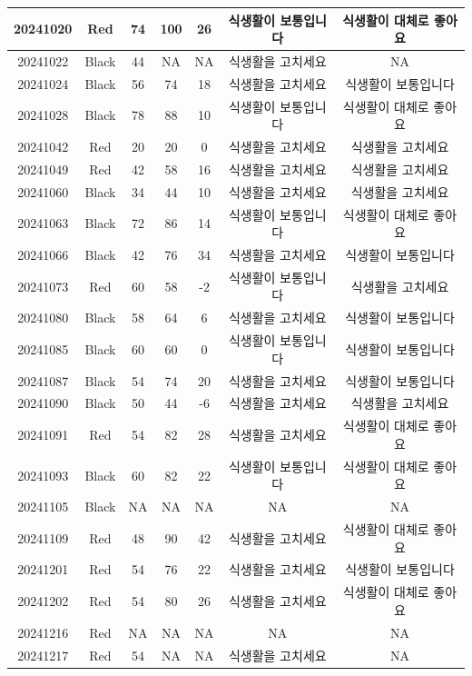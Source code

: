 \documentclass[
]{book}
\begin{document}
\begin{tabular}{c|c|c|c|c|c|c}
\hline
20241020 & Red & 74 & 100 & 26 & 식생활이 보통입니다 & 식생활이 대체로 좋아요\\
\hline
20241022 & Black & 44 & NA & NA & 식생활을 고치세요 & NA\\
\hline
20241024 & Black & 56 & 74 & 18 & 식생활을 고치세요 & 식생활이 보통입니다\\
\hline
20241028 & Black & 78 & 88 & 10 & 식생활이 보통입니다 & 식생활이 대체로 좋아요\\
\hline
20241042 & Red & 20 & 20 & 0 & 식생활을 고치세요 & 식생활을 고치세요\\
\hline
20241049 & Red & 42 & 58 & 16 & 식생활을 고치세요 & 식생활을 고치세요\\
\hline
20241060 & Black & 34 & 44 & 10 & 식생활을 고치세요 & 식생활을 고치세요\\
\hline
20241063 & Black & 72 & 86 & 14 & 식생활이 보통입니다 & 식생활이 대체로 좋아요\\
\hline
20241066 & Black & 42 & 76 & 34 & 식생활을 고치세요 & 식생활이 보통입니다\\
\hline
20241073 & Red & 60 & 58 & -2 & 식생활이 보통입니다 & 식생활을 고치세요\\
\hline
20241080 & Black & 58 & 64 & 6 & 식생활을 고치세요 & 식생활이 보통입니다\\
\hline
20241085 & Black & 60 & 60 & 0 & 식생활이 보통입니다 & 식생활이 보통입니다\\
\hline
20241087 & Black & 54 & 74 & 20 & 식생활을 고치세요 & 식생활이 보통입니다\\
\hline
20241090 & Black & 50 & 44 & -6 & 식생활을 고치세요 & 식생활을 고치세요\\
\hline
20241091 & Red & 54 & 82 & 28 & 식생활을 고치세요 & 식생활이 대체로 좋아요\\
\hline
20241093 & Black & 60 & 82 & 22 & 식생활이 보통입니다 & 식생활이 대체로 좋아요\\
\hline
20241105 & Black & NA & NA & NA & NA & NA\\
\hline
20241109 & Red & 48 & 90 & 42 & 식생활을 고치세요 & 식생활이 대체로 좋아요\\
\hline
20241201 & Red & 54 & 76 & 22 & 식생활을 고치세요 & 식생활이 보통입니다\\
\hline
20241202 & Red & 54 & 80 & 26 & 식생활을 고치세요 & 식생활이 대체로 좋아요\\
\hline
20241216 & Red & NA & NA & NA & NA & NA\\
\hline
20241217 & Red & 54 & NA & NA & 식생활을 고치세요 & NA\\

\end{tabular}
\end{document}

